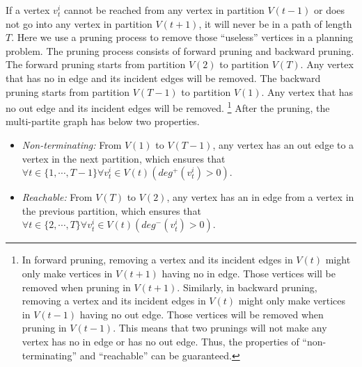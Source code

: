 \documentclass[12pt]{article}
\begin{document}
If a vertex $ v^{i}_{t} $ cannot be reached from any vertex in partition $ V(t-1) $ or does not go into any vertex in partition $ V(t+1) $, it will never be in a path of length $ T $.
Here we use a pruning process to remove those ``useless'' vertices in a planning problem.
The pruning process consists of forward pruning and backward pruning.
The forward pruning starts from partition $ V(2) $ to partition $ V(T) $.
Any vertex that has no in edge and its incident edges will be removed.
The backward pruning starts from partition $ V(T-1) $ to partition $ V(1) $.
Any vertex that has no out edge and its incident edges will be removed.
\footnote{In forward pruning, removing a vertex and its incident edges in $ V(t) $ might only make vertices in $ V(t+1) $ having no in edge.
Those vertices will be removed when pruning in $ V(t+1) $.
Similarly, in backward pruning, removing a vertex and its incident edges in $ V(t) $ might only make vertices in $ V(t-1) $ having no out edge.
Those vertices will be removed when pruning in $ V(t-1) $.  
This means that two prunings will not make any vertex has no in edge or has no out edge.
Thus, the properties of ``non-terminating'' and ``reachable'' can be guaranteed.}
After the pruning, the multi-partite graph has below two properties.
\begin{itemize}
\item \emph{Non-terminating:} From $ V(1) $ to $ V(T-1) $, any vertex has an out edge to a vertex in the next partition, which ensures that $ \forall t \in \{ 1 , \cdots , T-1 \} \forall v^{i}_{ t } \in V( t )  ( deg^{+}(v^{i}_{ t }) > 0 )  $.
\item \emph{Reachable:} From $ V(T) $ to $ V(2) $, any vertex has an in edge from a vertex in the previous partition, which ensures that $ \forall t \in \{ 2, \cdots , T \} \forall v^{i}_{ t } \in V( t )  ( deg^{-}(v^{i}_{ t }) > 0 )  $. 
\end{itemize}

\end{document}
